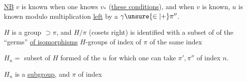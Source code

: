 \uline{NB} $v$ is known when one knows $v_*$ (\uline{these conditions}), and when $v$ is known, $u$ is known  modulo multiplication \uline{ left} by a $\gamma\unsure{\in|+}\pi''$.


$H$ is a group $\supset\pi$, and $H/\pi$ (cosets  right) is identified with a subset of  of the ``germs'' \uline{of isomorphisms}  $H$-groups of  index of $\pi$ of the same index

$H_n=$ subset of $H$ formed of the $u$ for which one can take $\pi',\pi''$ of index $n$.

$H_n$ is a \uline{subgroup}, and $\pi$ of index
